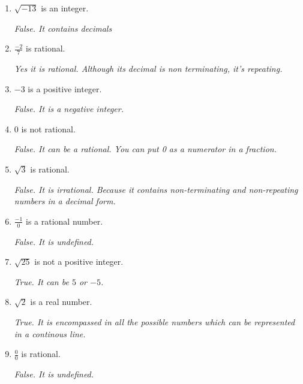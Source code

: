 \documentclass{article}
\begin{document}
\begin{enumerate}
    \item $\sqrt{-13}$ is an integer.\par
    \textit{False. It contains decimals} \par

    \item $\frac{-2}{7}$ is rational.\par
    \textit{
        Yes it is rational. Although its decimal is non
        terminating, it's repeating.
    }\par

    \item $-3$ is a positive integer.\par
    \textit{False. It is a negative integer.}\par

    \item $0$ is not rational.\par
    \textit{
        False. It can be a rational. You can put 0
        as a numerator in a fraction.
    }\par

    \item $\sqrt{3}$ is rational.\par
    \textit{
        False. It is irrational. Because it contains non-terminating and
        non-repeating numbers in a decimal form.
    }\par

    \item $\frac{-1}{0}$ is a rational number.\par
    \textit{
        False. It is undefined.
    }\par

    \item $\sqrt{25}$ is not a positive integer.\par
    \textit{
        True. It can be $5$ or $-5$.
    }\par

    \item $\sqrt{2}$ is a real number.\par
    \textit{
        True. It is encompassed in all the possible numbers
        which can be represented in a continous line.
    }\par

    \item $\frac{0}{0}$ is rational.\par
    \textit{
        False. It is undefined.
    }\par


\end{enumerate}
\end{document}

